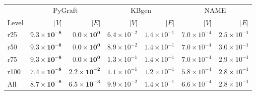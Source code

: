 \begin{tabular}{lrr|rr|rr}
\toprule
 & \multicolumn{2}{c|}{PyGraft} & \multicolumn{2}{c|}{KBgen} & \multicolumn{2}{c}{NAME} \\
Level & $|V|$ & $|E|$ & $|V|$ & $|E|$ & $|V|$ & $|E|$ \\
\midrule
r25 & $\mathbf{9.3\times10^{-8}}$ & $\mathbf{0.0\times10^{0}}$ & $6.4\times10^{-2}$ & $1.4\times10^{-1}$ & $7.0\times10^{-4}$ & $2.5\times10^{-1}$ \\
r50 & $\mathbf{9.3\times10^{-8}}$ & $\mathbf{0.0\times10^{0}}$ & $8.9\times10^{-2}$ & $1.4\times10^{-1}$ & $7.0\times10^{-4}$ & $3.0\times10^{-1}$ \\
r75 & $\mathbf{9.3\times10^{-8}}$ & $\mathbf{0.0\times10^{0}}$ & $1.3\times10^{-1}$ & $1.4\times10^{-1}$ & $7.0\times10^{-4}$ & $2.9\times10^{-1}$ \\
r100 & $\mathbf{7.4\times10^{-8}}$ & $\mathbf{2.2\times10^{-2}}$ & $1.1\times10^{-1}$ & $1.2\times10^{-1}$ & $5.8\times10^{-4}$ & $2.8\times10^{-1}$ \\
\midrule
All & $\mathbf{8.7\times10^{-8}}$ & $\mathbf{6.5\times10^{-3}}$ & $9.9\times10^{-2}$ & $1.4\times10^{-1}$ & $6.6\times10^{-4}$ & $2.8\times10^{-1}$ \\
\bottomrule
\end{tabular}

